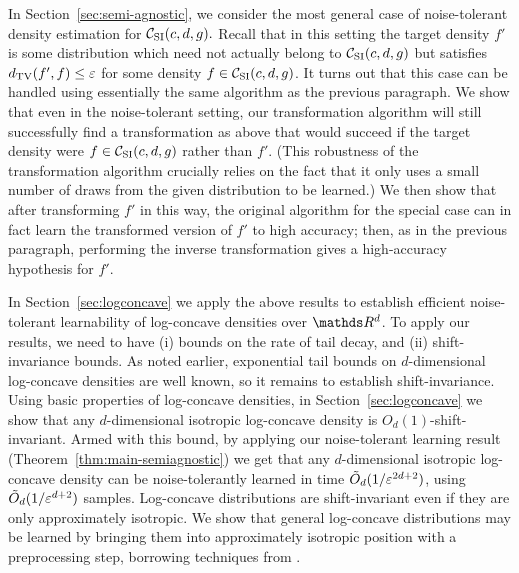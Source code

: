 In Section~\ref{sec:semi-agnostic}, we consider the most general case of noise-tolerant density estimation for ${\mathcal C}_{\mathrm{SI}}(c,d,g).$  Recall that in this setting the target density $f'$ is some distribution which need not actually belong to ${\mathcal C}_{\mathrm{SI}}(c,d,g)$ but satisfies $d_\mathrm{TV}(f',f) \leq \varepsilon$ for some density $f \in {\mathcal C}_{\mathrm{SI}}(c,d,g)$.  It turns out that this case can be handled using essentially the same algorithm as the previous paragraph.  We show that even in the noise-tolerant setting, our transformation algorithm will still successfully find a transformation as above that would succeed if the target density were $f \in {\mathcal C}_{\mathrm{SI}}(c,d,g)$ rather than $f'$.  (This robustness of the transformation algorithm crucially relies on the fact that it only uses a small number of draws from the given distribution to be learned.)  We then show that after transforming $f'$ in this way, the original algorithm for the special case can in fact learn the transformed version of $f'$ to high accuracy; then, as in the previous paragraph, performing the inverse transformation gives a high-accuracy hypothesis for $f'$.

In Section~\ref{sec:logconcave} we apply the above results to establish efficient noise-tolerant learnability of log-concave densities over $\R^d$. To apply our results, we need to have (i) bounds on the rate of tail decay, and (ii) shift-invariance bounds.  As noted earlier, exponential tail bounds on $d$-dimensional log-concave densities are well known, so it  remains to establish shift-invariance.  Using basic properties of log-concave densities, in Section~\ref{sec:logconcave} we show that any $d$-dimensional isotropic
log-concave density is $O_d(1)$-shift-invariant.  Armed with this bound, by applying our noise-tolerant learning result (Theorem~\ref{thm:main-semiagnostic}) we get that any $d$-dimensional isotropic log-concave density can be noise-tolerantly learned in time $\tilde{O}_d(1/\varepsilon^{2d+2})$, using $\tilde{O}_d(1/\varepsilon^{d+2})$ samples.
Log-concave distributions are shift-invariant even if they are only approximately isotropic.
We show that general log-concave distributions may be learned by bringing them into approximately
isotropic position with a preprocessing step, borrowing techniques from \cite{LovaszVempala07}.

\medskip

